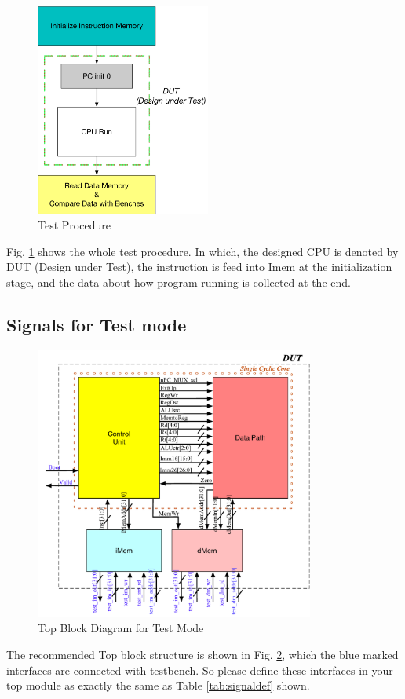 \documentclass[a4paper]{article}
\begin{document}
\begin{figure}[ht]
 \centering
 \includegraphics[height=7cm]{images/l1TestProc.pdf}
 \caption{Test Procedure}
 \label{fig:testproc}
\end{figure}

Fig. \ref{fig:testproc} shows the whole test procedure. In which, the designed CPU is denoted by DUT (Design under Test), the instruction is feed into Imem at the initialization stage, and the data about how program running is collected at the end.

\subsection{Signals for Test mode}\label{sub:signal}

\begin{figure}[ht]
	\centering
	\includegraphics[height=9cm]{images/l1ModulesTest.pdf}
	\caption{Top Block Diagram for Test Mode}
	\label{fig:moduletest}
\end{figure}
The recommended Top block structure is shown in Fig. \ref{fig:moduletest}, which the blue marked interfaces are connected with testbench. So please define these interfaces in your top module as exactly the same as Table \ref{tab:signaldef} shown.
\end{document}
